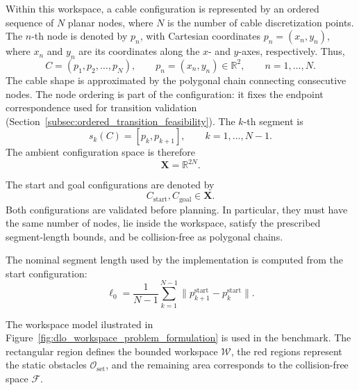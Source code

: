 \documentclass{pas}
\begin{document}
Within this workspace, a cable configuration is represented by an ordered
sequence of \(N\) planar nodes, where \(N\) is the number of cable
discretization points. The \(n\)-th node is denoted by \(p_n\), with Cartesian
coordinates \(p_n=(x_n,y_n)\), where \(x_n\) and \(y_n\) are its coordinates
along the \(x\)- and \(y\)-axes, respectively. Thus,
\begin{equation}
C
=
(p_1,p_2,\ldots,p_N),
\qquad
p_n=(x_n,y_n)\in\mathbb{R}^{2},
\qquad
n=1,\ldots,N .
\label{eq:cable_configuration_definition}
\end{equation}
The cable shape is approximated by the polygonal chain connecting consecutive nodes. The node ordering is part of the configuration: it fixes the endpoint correspondence used for transition validation (Section~\ref{subsec:ordered_transition_feasibility}). The \(k\)-th segment is
\begin{equation}
s_k(C)
=
[p_k,p_{k+1}],
\qquad
k=1,\ldots,N-1 .
\label{eq:cable_segment_definition}
\end{equation}
The ambient configuration space is therefore
\begin{equation}
\mathbf{X}
=
\mathbb{R}^{2N}.
\label{eq:ambient_configuration_space}
\end{equation}

The start and goal configurations are denoted by
\begin{equation}
C_{\mathrm{start}},C_{\mathrm{goal}}\in\mathbf{X}.
\label{eq:start_goal_configurations}
\end{equation}
Both configurations are validated before planning. In particular, they must have the same number of nodes, lie inside the workspace, satisfy the prescribed segment-length bounds, and be collision-free as polygonal chains.

The nominal segment length used by the implementation is computed from the start configuration:
\begin{equation}
\ell_0
=
\frac{1}{N-1}
\sum_{k=1}^{N-1}
\|p_{k+1}^{\mathrm{start}}-p_k^{\mathrm{start}}\|.
\label{eq:nominal_segment_length_from_start}
\end{equation}

The workspace model ilustrated in Figure~\ref{fig:dlo_workspace_problem_formulation} is used in the benchmark. The rectangular region defines the bounded workspace \(\mathcal{W}\), the red regions represent the static obstacles \(\mathcal{O}_{\mathrm{set}}\), and the remaining area corresponds to the collision-free space \(\mathcal{F}\).
\end{document}
